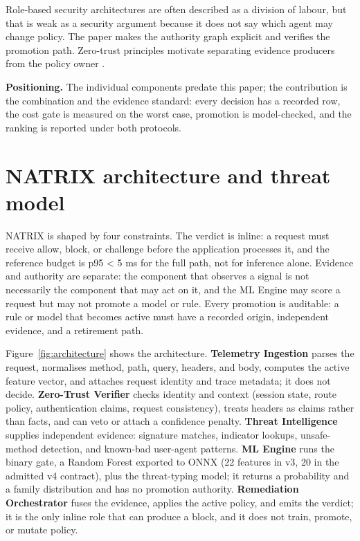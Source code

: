 \documentclass[preprint,11pt]{elsarticle}
\begin{document}
Role-based security architectures are often described as a division of
labour, but that is weak as a security argument because it does not say
which agent may change policy. The paper makes the authority graph
explicit and verifies the promotion path. Zero-trust principles motivate
separating evidence producers from the policy owner
\citep{nist2020zero}.

\textbf{Positioning.} The individual components predate this paper; the
contribution is the combination and the evidence standard: every
decision has a recorded row, the cost gate is measured on the worst
case, promotion is model-checked, and the ranking is reported under both
protocols.

\section{NATRIX architecture and threat
model}\label{natrix-architecture-and-threat-model}

NATRIX is shaped by four constraints. The verdict is inline: a request
must receive allow, block, or challenge before the application processes
it, and the reference budget is p95 \textless{} 5 ms for the full path,
not for inference alone. Evidence and authority are separate: the
component that observes a signal is not necessarily the component that
may act on it, and the ML Engine may score a request but may not promote
a model or rule. Every promotion is auditable: a rule or model that
becomes active must have a recorded origin, independent evidence, and a
retirement path.

Figure~\ref{fig:architecture} shows the architecture. \textbf{Telemetry Ingestion} parses the
request, normalises method, path, query, headers, and body, computes the
active feature vector, and attaches request identity and trace metadata;
it does not decide. \textbf{Zero-Trust Verifier} checks identity and
context (session state, route policy, authentication claims, request
consistency), treats headers as claims rather than facts, and can veto
or attach a confidence penalty. \textbf{Threat Intelligence} supplies
independent evidence: signature matches, indicator lookups,
unsafe-method detection, and known-bad user-agent patterns. \textbf{ML
Engine} runs the binary gate, a Random Forest exported to ONNX (22
features in v3, 20 in the admitted v4 contract), plus the threat-typing
model; it returns a probability and a family distribution and has no
promotion authority. \textbf{Remediation Orchestrator} fuses the
evidence, applies the active policy, and emits the verdict; it is the
only inline role that can produce a block, and it does not train,
promote, or mutate policy.
\end{document}
